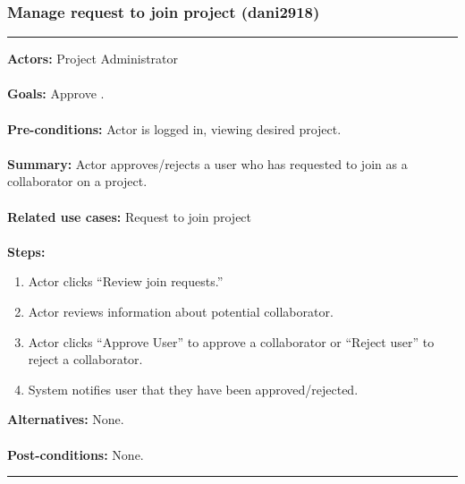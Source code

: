 \documentclass[11pt]{report}
\begin{document}
\subsubsection{Manage request to join project (dani2918)}
\vspace{2pt}
\hrule
\vspace{8pt}
 \textbf{Actors:} Project Administrator \\ \\
\textbf{Goals:} Approve . \\ \\
 \textbf{Pre-conditions:} Actor is logged in, viewing desired project.  \\ \\
\textbf{Summary:} Actor approves/rejects a user who has requested to join as a collaborator on a project.\\ \\
\textbf{Related use cases:} Request to join project \\ \\
\textbf{Steps:} \begin{enumerate}
  \item Actor clicks ``Review join requests.'' 
  \item Actor reviews information about potential collaborator.
  \item Actor clicks ``Approve User'' to approve a collaborator or ``Reject user'' to reject a collaborator.
  \item System notifies user that they have been approved/rejected.
 \end{enumerate}
 \textbf{Alternatives:} None. \\ \\
 \textbf{Post-conditions:} None. \\
\vspace{8pt}
\hrule
\newpage
\end{document}
